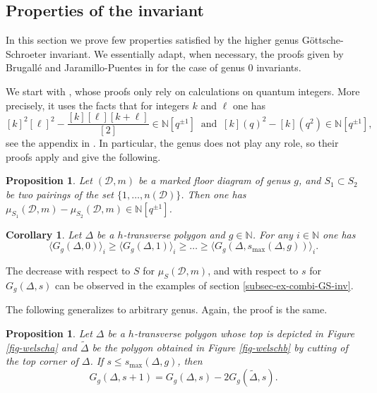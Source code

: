 \documentclass[11pt]{article}
\newtheorem{prop}[theo]{Proposition}
\newtheorem{coro}[theo]{Corollary}
\theoremstyle{definition}
\numberwithin{equation}{section}
\newcommand{\N}{\mathbb{N}}
\newcommand{\D}{\mathcal{D}}
\newcommand{\ang}[1]{\langle #1\rangle}
\newcommand{\smax}{s_{\max}}
\theoremstyle{plain}
\begin{document}
\subsection{Properties of the invariant}

In this section we prove few properties satisfied by the higher genus Göttsche-Schroeter invariant. We essentially adapt, when necessary, the proofs given by Brugallé and Jaramillo-Puentes in \cite{brugalle_polynomiality_2022} for the case of genus $0$ invariants.


We start with \cite[Proposition 2.16 and Corollary 2.17]{brugalle_polynomiality_2022}, whose proofs only rely on calculations on quantum integers. More precisely, it uses the facts that for integers $k$ and $\ell$ one has \[ [k]^2 [\ell]^2-\dfrac{[k][\ell][k+\ell]}{[2]} \in\N[q^{\pm1}] \ \text{ and }\ [k](q)^2 - [k](q^2) \in\N[q^{\pm1}] ,  \] see the appendix in \cite{brugalle_polynomiality_2022}. In particular, the genus does not play any role, so their proofs apply and give the following.

\begin{prop}
Let $(\D,m)$ be a marked floor diagram of genus $g$, and $S_1 \subset S_2$ be two pairings of the set $\{1,\dots,n(\D)\}$. Then one has $\mu_{S_1}(\D,m) - \mu_{S_2}(\D,m) \in \N[q^{\pm 1}]$. 
\end{prop}

\begin{coro} \label{coro-decrease-with-s}
Let $\Delta$ be a $h$-transverse polygon and $g\in\N$. For any $i\in\N$ one has
\[ \ang{G_g(\Delta,0)}_i \geqslant \ang{G_g(\Delta,1)}_i \geqslant \dots \geqslant \ang{G_g(\Delta,\smax(\Delta,g))}_i . \]
\end{coro}


The decrease with respect to $S$ for $\mu_S(\D,m)$, and with respect to $s$ for $G_g(\Delta,s)$ can be observed in the examples of section \ref{subsec-ex-combi-GS-inv}.

The following generalizes \cite[Proposition 2.19]{brugalle_polynomiality_2022} to arbitrary genus. Again, the proof is the same.


\begin{prop} \label{prop-welsch}
Let $\Delta$ be a $h$-transverse polygon whose top is depicted in Figure \ref{fig-welscha} and $\widetilde\Delta$ be the polygon obtained in Figure \ref{fig-welschb} by cutting of the top corner of $\Delta$. 
If $s \leqslant \smax(\Delta,g)$, then 
\[ G_g(\Delta,s+1) = G_g(\Delta,s) - 2 G_g(\widetilde \Delta,s) . \]
\end{prop}
\end{document}
